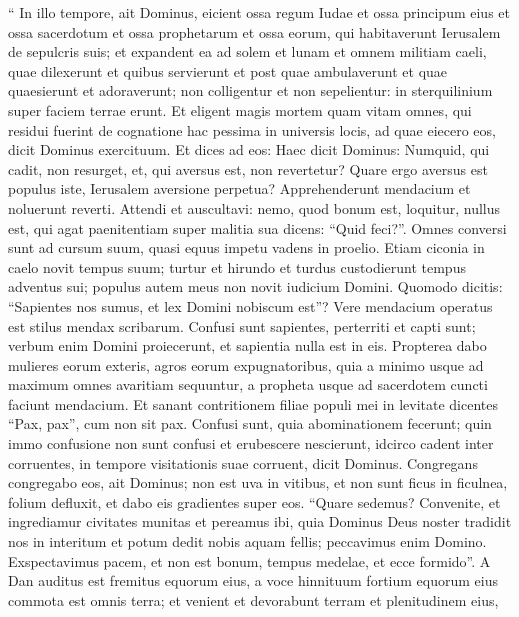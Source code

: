 \begin{biblechapter}
\begin{biblechapter}
\begin{biblechapter}
\begin{biblechapter}
\begin{biblechapter}
\begin{biblechapter}
\begin{biblechapter}
\begin{biblechapter}
\verse “ In illo tempore, ait Dominus, eicient ossa regum Iudae et ossa principum eius et ossa sacerdotum et ossa prophetarum et ossa eorum, qui habitaverunt Ierusalem de sepulcris suis; 
\verse et expandent ea ad solem et lunam et omnem militiam caeli, quae dilexerunt et quibus servierunt et post quae ambulaverunt et quae quaesierunt et adoraverunt; non colligentur et non sepelientur: in sterquilinium super faciem terrae erunt. 
\verse Et eligent magis mortem quam vitam omnes, qui residui fuerint de cognatione hac pessima in universis locis, ad quae eiecero eos, dicit Dominus exercituum.
 \verse Et dices ad eos: Haec dicit Dominus:
 Numquid, qui cadit, non resurget, et, qui aversus est, non revertetur?
 \verse Quare ergo aversus est populus iste,
 Ierusalem aversione perpetua?
 Apprehenderunt mendacium
 et noluerunt reverti.
 \verse Attendi et auscultavi:
 nemo, quod bonum est, loquitur,
 nullus est, qui agat paenitentiam
 super malitia sua dicens:
 “Quid feci?”.
 Omnes conversi sunt ad cursum suum,
 quasi equus impetu vadens in proelio.
 \verse Etiam ciconia in caelo
 novit tempus suum;
 turtur et hirundo et turdus
 custodierunt tempus adventus sui;
 populus autem meus non novit
 iudicium Domini.
 \verse Quomodo dicitis: “Sapientes nos sumus,
 et lex Domini nobiscum est”?
 Vere mendacium operatus est
 stilus mendax scribarum.
 \verse Confusi sunt sapientes,
 perterriti et capti sunt;
 verbum enim Domini proiecerunt,
 et sapientia nulla est in eis.
 \verse Propterea dabo mulieres eorum exteris,
 agros eorum expugnatoribus,
 quia a minimo usque ad maximum
 omnes avaritiam sequuntur,
 a propheta usque ad sacerdotem
 cuncti faciunt mendacium.
 \verse Et sanant contritionem
 filiae populi mei in levitate
 dicentes “Pax, pax”, cum non sit pax.
 \verse Confusi sunt, quia abominationem fecerunt;
 quin immo confusione non sunt confusi
 et erubescere nescierunt,
 idcirco cadent inter corruentes,
 in tempore visitationis suae corruent,
 dicit Dominus.
 \verse Congregans congregabo eos,
 ait Dominus;
 non est uva in vitibus,
 et non sunt ficus in ficulnea,
 folium defluxit,
 et dabo eis gradientes super eos.
 \verse “Quare sedemus?
 Convenite, et ingrediamur civitates munitas
 et pereamus ibi,
 quia Dominus Deus noster tradidit nos in interitum
 et potum dedit nobis aquam fellis;
 peccavimus enim Domino.
 \verse Exspectavimus pacem, et non est bonum,
 tempus medelae, et ecce formido”.
 \verse A Dan auditus est fremitus equorum eius,
 a voce hinnituum fortium equorum eius
 commota est omnis terra;
 et venient et devorabunt terram et plenitudinem eius,

\end{biblechapter}
\end{biblechapter}
\end{biblechapter}
\end{biblechapter}
\end{biblechapter}
\end{biblechapter}
\end{biblechapter}
\end{biblechapter}
